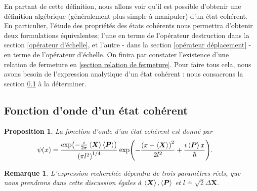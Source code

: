 \documentclass[11pt,oneside,a4paper]{article}
\newtheorem{property}[theorem]{Proposition}
\newtheorem{remark}[theorem]{Remarque}
\begin{document}
En partant de cette définition, nous allons voir qu'il est possible d'obtenir une définition algébrique (généralement plus simple à manipuler) d'un état cohérent. En particulier, l'étude des propriétés des états cohérents nous permettra d'obtenir deux formulations équivalentes; l'une en terme de l'opérateur destruction dans la section \ref{opérateur d'échelle}, et l'autre - dans la section \ref{opérateur déplacement} - en terme de l'opérateur d'échelle. On finira par constater l'existence d'une relation de fermeture en \ref{section relation de fermeture}. Pour faire tous cela, nous avons besoin de l'expression analytique d'un état cohérent : nous consacrons la section \ref{fonction d'onde d'un état cohérent} à la déterminer.

\subsection{Fonction d'onde d'un état cohérent}
\label{fonction d'onde d'un état cohérent}
\begin{property}
  La fonction d'onde d'un état cohérent est donné par
  \begin{align}
    \label{fonction d'onde}
    \psi(x) &= \frac{\exp(-\frac{i}{2\pi}\expval{\bm{X}}\expval{\bm{P}})}{\left(\pi l^2\right)^{1/4}}\exp(-\frac{\left(x-\expval{\bm{X}}\right)^2}{2l^2}+\frac{i\expval{\bm{P}}x}{\hbar}).
  \end{align}
\end{property}

\begin{remark}
  L'expression recherchée dépendra de trois paramètres réels, que nous prendrons dans cette discussion égales à $\expval{\bm{X}},\expval{\bm{P}}$ et $l \doteq \sqrt{2}\Delta\bm{X}$.
\end{remark}
\end{document}
